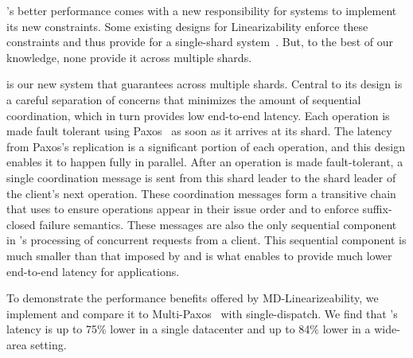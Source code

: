 
\Mdl{}'s better performance comes with a new responsibility for systems to implement its new constraints.
Some existing designs for Linearizability enforce these constraints and thus provide \mdl{} for a single-shard system~\cite{ongaro2014consensus}.
But, to the best of our knowledge, none provide it across multiple shards.

\sys{} is our new system that guarantees \mdl{} across multiple shards.
Central to its design is a careful separation of concerns that minimizes the amount of sequential coordination, which in turn provides low end-to-end latency.
Each operation is made fault tolerant using Paxos~\cite{lamport1998paxos} as soon as it arrives at its shard.
The latency from Paxos's replication is a significant portion of each operation, and this design enables it to happen fully in parallel.
After an operation is made fault-tolerant, a single coordination message is sent from this shard leader to the shard leader of the client's next operation.
These coordination messages form a transitive chain that \sys{} uses to ensure operations appear in their issue order and to enforce suffix-closed failure semantics.
These messages are also the only sequential component in \sys{}'s processing of concurrent requests from a client.
This sequential component is much smaller than that imposed by \sdl{} and is what enables \sys{} to provide much lower end-to-end latency for applications.

To demonstrate the performance benefits offered by MD-Linearizeability,
we implement \sys{} and compare it to Multi-Paxos~\cite{lamport1998paxos} with single-dispatch.
We find that 
\sys{}'s latency is up to 75\% lower in a single datacenter
and up to 84\% lower in a wide-area setting.

